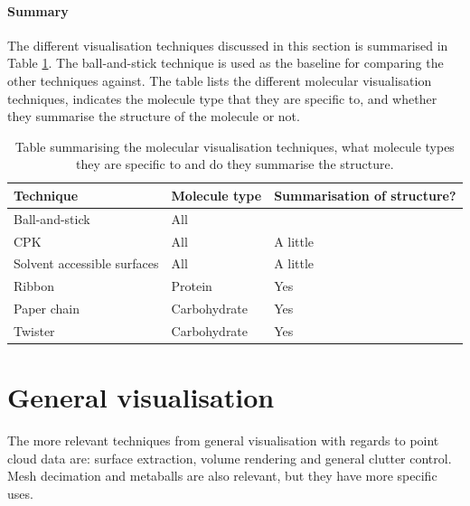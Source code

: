 
\paragraph{Summary}

The different visualisation techniques discussed in this section is summarised
in Table \ref{tab:background_molecular}. The ball-and-stick technique is used
as the baseline for comparing the other techniques against. The table lists the
different molecular visualisation techniques, indicates the molecule type that
they are specific to, and whether they summarise the structure of the molecule
or not.

\begin{table}
  \begin{tabular}{ | l | l | l | }
  \hline
  Technique                   & Molecule type & Summarisation of structure?  \\ \hline
  Ball-and-stick              & All           &                              \\ \hline
  CPK                         & All           & A little                     \\ \hline
  Solvent accessible surfaces & All           & A little                     \\ \hline
  Ribbon                      & Protein       & Yes                          \\ \hline
  Paper chain                 & Carbohydrate  & Yes                          \\ \hline
  Twister                     & Carbohydrate  & Yes                          \\ \hline
  \end{tabular}
  \caption{Table summarising the molecular visualisation techniques, what
  molecule types they are specific to and do they summarise the structure.}
  \label{tab:background_molecular}
\end{table}



\section{General visualisation}
\label{sec:background_general}


The more relevant techniques from general visualisation with regards to point
cloud data are: surface extraction, volume rendering and general clutter
control. Mesh decimation and metaballs are also relevant, but they have more
specific uses.

